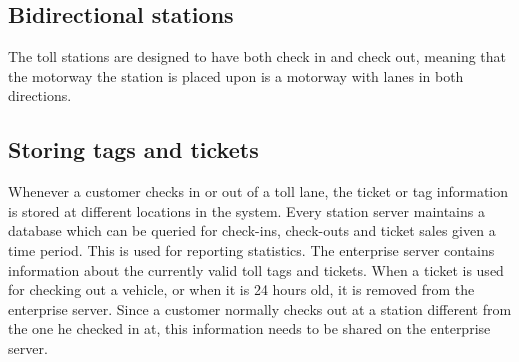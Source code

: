 \subsection{Bidirectional stations}
The toll stations are designed to have both check in and check out, meaning that the motorway the station is placed upon is a motorway with lanes in both directions.

\subsection{Storing tags and tickets}
Whenever a customer checks in or out of a toll lane, the ticket or tag information is stored at different locations in the system. Every station server maintains a database which can be queried for check-ins, check-outs and ticket sales given a time period. This is used for reporting statistics. The enterprise server contains information about the currently valid toll tags and tickets. When a ticket is used for checking out a vehicle, or when it is 24 hours old, it is removed from the enterprise server. Since a customer normally checks out at a station different from the one he checked in at, this information needs to be shared on the enterprise server.